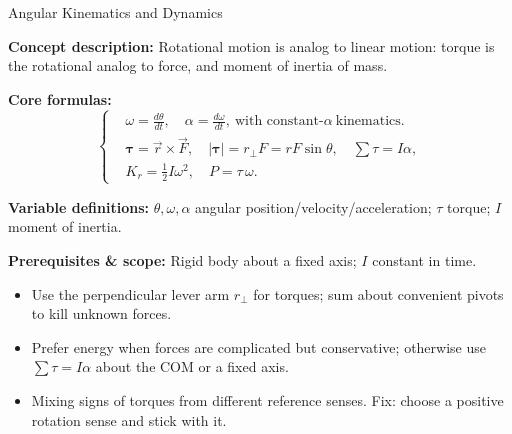 \label{unit:rotation}

\begin{KnowledgePoint}{Angular Kinematics and Dynamics \Core}
  \KPFormulas
  \begin{formulabox}
  \textbf{Concept description:} Rotational motion is analog to linear motion: torque is the rotational analog to force, and moment of inertia of mass.

  \textbf{Core formulas:}
  \[
  \left\{\begin{aligned}
    &\omega=\frac{d\theta}{dt},\quad \alpha=\frac{d\omega}{dt},\ \text{with constant-}\alpha\ \text{kinematics}.\\
&\boldsymbol{\tau}=\vec r\times\vec F,\quad |\boldsymbol{\tau}|=r_\perp F=rF\sin\theta,\quad \sum \tau=I\alpha,\\
    &K_r=\tfrac12 I\omega^2,\quad P=\tau\,\omega.
  \end{aligned}\right.
  \]

  \textbf{Variable definitions:} $\theta,\omega,\alpha$ angular position/velocity/acceleration; $\tau$ torque; $I$ moment of inertia.

  
  
  \textbf{Prerequisites \& scope:} Rigid body about a fixed axis; $I$ constant in time.
  \end{formulabox}

  \KPHeuristics
  \begin{heuristicsbox}
  \begin{itemize}[leftmargin=*]
    \item Use the perpendicular lever arm $r_\perp$ for torques; sum about convenient pivots to kill unknown forces.
    \item Prefer energy when forces are complicated but conservative; otherwise use $\sum \tau=I\alpha$ about the COM or a fixed axis.
  \end{itemize}
  \vspace{0.4em}
  \begin{itemize}[leftmargin=*]
    \item Mixing signs of torques from different reference senses. Fix: choose a positive rotation sense and stick with it.
  \end{itemize}
  \end{heuristicsbox}


\end{KnowledgePoint}
